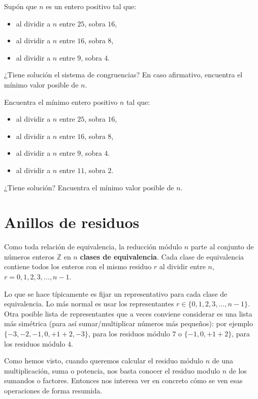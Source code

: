 \begin{ejercicio}
Supón que $n$ es un entero positivo tal que:  
\begin{itemize}
\item al dividir a $n$ entre $25$, sobra $16$,
\item al dividir a $n$ entre $16$, sobra $8$,
\item al dividir a $n$ entre $9$, sobra $4$.
\end{itemize}
¿Tiene solución el sistema de congruencias?
En caso afirmativo, encuentra el mínimo valor posible de $n$.
\end{ejercicio}

\begin{ejercicio}
Encuentra el mínimo entero positivo $n$ tal que:  
\begin{itemize}
\item al dividir a $n$ entre $25$, sobra $16$,
\item al dividir a $n$ entre $16$, sobra $8$,
\item al dividir a $n$ entre $9$, sobra $4$.
\item al dividir a $n$ entre $11$, sobra $2$.
\end{itemize}
¿Tiene solución?
Encuentra el mínimo valor posible de $n$.
\end{ejercicio}


\newpage 
\section{Anillos de residuos}

Como toda relación de equivalencia, la reducción módulo $n$ parte al conjunto de números enteros $\mathbb Z$ en $n$ {\bf clases de equivalencia}. Cada clase de equivalencia contiene todos los enteros con el mismo residuo $r$ al dividir entre $n$, $r=0,1,2,3,\dots, n-1$.

Lo que se hace típicamente es fijar un representativo para cada clase de equivalencia. Lo más normal es usar los representantes $r\in \{0,1,2,3,\dots, n-1\}$. Otra posible lista de representantes que a veces conviene considerar es una lista más simétrica (para así sumar/multiplicar números más pequeños): por ejemplo $\{-3,-2,-1,0,+1+2,-3\}$, para los residuos módulo $7$ o $\{-1,0,+1+2\}$, para los residuos módulo $4$.

Como hemos visto, cuando queremos calcular el residuo módulo $n$ de una multiplicación, suma o potencia, nos basta conocer el residuo modulo $n$ de los sumandos o factores. Entonces nos interesa ver en concreto cómo se ven esas operaciones de forma resumida.

